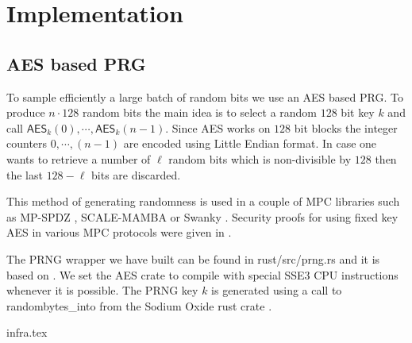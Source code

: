 \section{Implementation}

\subsection{AES based PRG}
\label{sec:aes}

To sample efficiently a large batch of random bits we use an AES based PRG.
To produce $n \cdot 128$ random bits the main idea is to select a random
$128$ bit key $k$ and call $\mathsf{AES}_k(0), \cdots, \mathsf{AES}_k(n-1)$.
Since AES works on $128$ bit blocks the integer counters $0, \cdots, (n-1)$
are encoded using Little Endian format.  In case one wants to retrieve a
number of $\ell$ random bits which is non-divisible by $128$ then the last
$128 - \ell$ bits are discarded.

This method of generating
randomness is used in a couple of MPC libraries such as MP-SPDZ
\cite{CCS:Keller20}, SCALE-MAMBA \cite{SCALE} or Swanky \cite{url-swanky}.
Security proofs for using fixed key AES in various MPC protocols were given
in \cite{SP:GKWY20}.

The PRNG wrapper we have built can be found in \textsf{rust/src/prng.rs} and
it is based on \cite{url-cargo-aes}.  We set the \textsf{AES} crate to
compile with special SSE3 CPU instructions whenever it is possible.
The PRNG key $k$ is generated using a call to \textsf{randombytes\_into}
from the Sodium Oxide rust crate \cite{url-sodiumoxide}.


{infra.tex}
